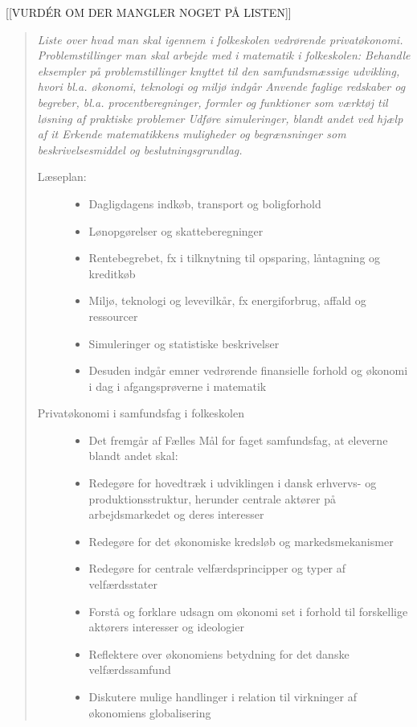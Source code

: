 [[VURDÉR OM DER MANGLER NOGET PÅ LISTEN]]
\begin{quotation} \itshape
Liste over hvad man skal igennem i folkeskolen vedrørende privatøkonomi.
Problemstillinger man skal arbejde med i matematik i folkeskolen:
Behandle eksempler på problemstillinger knyttet til den samfundsmæssige udvikling, hvori bl.a. økonomi, teknologi og miljø indgår
Anvende faglige redskaber og begreber, bl.a. procentberegninger, formler og funktioner som værktøj til løsning af praktiske problemer
Udføre simuleringer, blandt andet ved hjælp af it
Erkende matematikkens muligheder og begrænsninger som beskrivelsesmiddel og beslutningsgrundlag.

\begin{description}
\item[{Læseplan:}] \hfill
\noindent \begin{itemize}
\item{Dagligdagens indkøb, transport og boligforhold}
\item{Lønopgørelser og skatteberegninger}
\item{Rentebegrebet, fx i tilknytning til opsparing, låntagning og kreditkøb}
\item{Miljø, teknologi og levevilkår, fx energiforbrug, affald og ressourcer}
\item{Simuleringer og statistiske beskrivelser}
\item{Desuden indgår emner vedrørende finansielle forhold og økonomi i dag i afgangsprøverne i matematik}
\cite{FallesMalMatematik}
\end{itemize}

\item[Privatøkonomi i samfundsfag i folkeskolen] \hfill
\noindent \begin{itemize}
\item{Det fremgår af Fælles Mål for faget samfundsfag, at eleverne blandt andet skal:}
\item{Redegøre for hovedtræk i udviklingen i dansk erhvervs- og produktionsstruktur, herunder centrale aktører på arbejdsmarkedet og deres interesser}
\item{Redegøre for det økonomiske kredsløb og markedsmekanismer}
\item{Redegøre for centrale velfærdsprincipper og typer af velfærdsstater}
\item{Forstå og forklare udsagn om økonomi set i forhold til forskellige aktørers interesser og ideologier}
\item{Reflektere over økonomiens betydning for det danske velfærdssamfund}
\item{Diskutere mulige handlinger i relation til virkninger af økonomiens globalisering}
\end{itemize}


\end{description}
\end{quotation}
